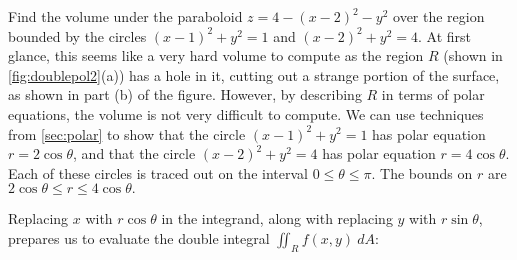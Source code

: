 \begin{example}\label{ex_doublepol2}
Find the volume under the paraboloid $z=4-(x-2)^2-y^2$ over the region bounded by the circles $(x-1)^2+y^2=1$ and $(x-2)^2+y^2=4$.
\solution
At first glance, this seems like a very hard volume to compute as the region $R$ (shown in \autoref{fig:doublepol2}(a)) has a hole in it, cutting out a strange portion of the surface, as shown in part (b) of the figure. However, by describing $R$ in terms of polar equations, the volume is not very difficult to compute. We can use techniques from \autoref{sec:polar} to show that the circle $(x-1)^2+y^2=1$ has polar equation $r=2\cos\theta$, and that the circle $(x-2)^2+y^2=4$ has polar equation $r=4\cos\theta$. Each of these circles is traced out on the interval $0\leq\theta\leq\pi$. The bounds on $r$ are $2\cos\theta\leq r\leq 4\cos\theta.$ 

Replacing $x$ with $r\cos\theta$ in the integrand, along with replacing $y$ with $r\sin \theta$, prepares us to evaluate the double integral $\iint_Rf(x,y)\ dA$:


\end{example}
